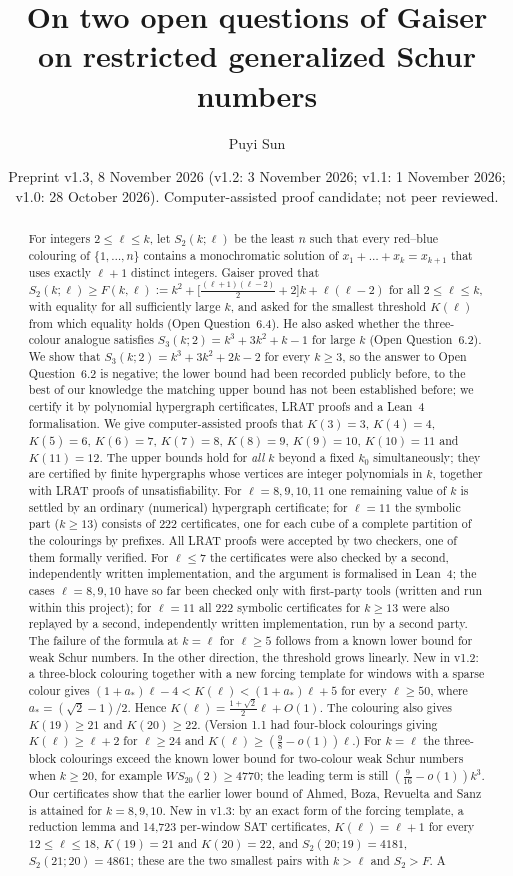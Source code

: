 \documentclass[11pt]{amsart}
\title[Two open questions on restricted generalized Schur numbers]{On two open questions of Gaiser on restricted generalized Schur numbers}
\author{Puyi Sun}
\date{Preprint v1.3, 8 November 2026 (v1.2: 3 November 2026; v1.1: 1 November 2026; v1.0: 28 October 2026). Computer-assisted proof candidate; not peer reviewed.}
\theoremstyle{definition}
\newcommand{\F}{F}
\newcommand{\Stwo}{S_2}
\begin{document}
\begin{abstract}
For integers $2\le \ell\le k$, let $\Stwo(k;\ell)$ be the least $n$ such that every red--blue colouring of $\{1,\dots,n\}$ contains a monochromatic solution of $x_1+\dots+x_k=x_{k+1}$ that uses exactly $\ell+1$ distinct integers. Gaiser proved that $\Stwo(k;\ell)\ge \F(k,\ell):=k^2+\bigl[\tfrac{(\ell+1)(\ell-2)}{2}+2\bigr]k+\ell(\ell-2)$ for all $2\le\ell\le k$, with equality for all sufficiently large $k$, and asked for the smallest threshold $K(\ell)$ from which equality holds (Open Question~6.4). He also asked whether the three-colour analogue satisfies $S_3(k;2)=k^3+3k^2+k-1$ for large $k$ (Open Question~6.2). We show that $S_3(k;2)=k^3+3k^2+2k-2$ for every $k\ge3$, so the answer to Open Question~6.2 is negative; the lower bound had been recorded publicly before, to the best of our knowledge the matching upper bound has not been established before; we certify it by polynomial hypergraph certificates, LRAT proofs and a Lean~4 formalisation. We give computer-assisted proofs that $K(3)=3$, $K(4)=4$, $K(5)=6$, $K(6)=7$, $K(7)=8$, $K(8)=9$, $K(9)=10$, $K(10)=11$ and $K(11)=12$. The upper bounds hold for \emph{all} $k$ beyond a fixed $k_0$ simultaneously; they are certified by finite hypergraphs whose vertices are integer polynomials in $k$, together with LRAT proofs of unsatisfiability. For $\ell=8,9,10,11$ one remaining value of $k$ is settled by an ordinary (numerical) hypergraph certificate; for $\ell=11$ the symbolic part ($k\ge13$) consists of 222 certificates, one for each cube of a complete partition of the colourings by prefixes. All LRAT proofs were accepted by two checkers, one of them formally verified. For $\ell\le7$ the certificates were also checked by a second, independently written implementation, and the argument is formalised in Lean~4; the cases $\ell=8,9,10$ have so far been checked only with first-party tools (written and run within this project); for $\ell=11$ all 222 symbolic certificates for $k\ge13$ were also replayed by a second, independently written implementation, run by a second party. The failure of the formula at $k=\ell$ for $\ell\ge5$ follows from a known lower bound for weak Schur numbers. In the other direction, the threshold grows linearly. New in v1.2: a three-block colouring together with a new forcing template for windows with a sparse colour gives $(1+a_*)\ell-4<K(\ell)<(1+a_*)\ell+5$ for every $\ell\ge50$, where $a_*=(\sqrt2-1)/2$. Hence $K(\ell)=\frac{1+\sqrt2}{2}\ell+O(1)$. The colouring also gives $K(19)\ge21$ and $K(20)\ge22$. (Version 1.1 had four-block colourings giving $K(\ell)\ge\ell+2$ for $\ell\ge24$ and $K(\ell)\ge(\frac98-o(1))\ell$.) For $k=\ell$ the three-block colourings exceed the known lower bound for two-colour weak Schur numbers when $k\ge20$, for example $WS_{20}(2)\ge4770$; the leading term is still $(\tfrac9{16}-o(1))k^3$. Our certificates show that the earlier lower bound of Ahmed, Boza, Revuelta and Sanz is attained for $k=8,9,10$. New in v1.3: by an exact form of the forcing template, a reduction lemma and 14{,}723 per-window SAT certificates, $K(\ell)=\ell+1$ for every $12\le\ell\le18$, $K(19)=21$ and $K(20)=22$, and $\Stwo(20;19)=4181$, $\Stwo(21;20)=4861$; these are the two smallest pairs with $k>\ell$ and $\Stwo>\F$. A 
\end{abstract}
\end{document}
